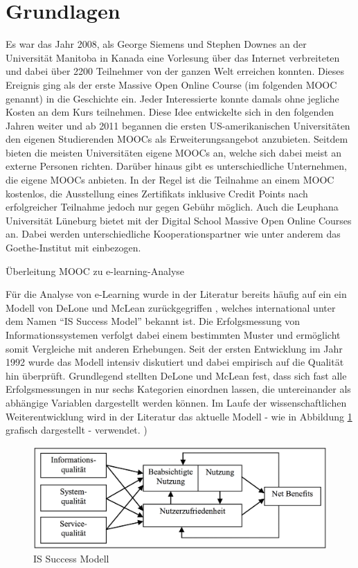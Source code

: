 \section{Grundlagen} %
\label{sec:grundlagen}
Es war das Jahr 2008, als George Siemens und Stephen Downes an der Universität Manitoba in Kanada eine Vorlesung über das Internet verbreiteten und dabei über 2200 Teilnehmer von der ganzen Welt erreichen konnten. Dieses Ereignis ging als der erste Massive Open Online Course (im folgenden MOOC genannt) in die Geschichte ein. Jeder Interessierte konnte damals ohne jegliche Kosten an dem Kurs teilnehmen. Diese Idee entwickelte sich in den folgenden Jahren weiter und ab 2011 begannen die ersten US-amerikanischen Universitäten den eigenen Studierenden MOOCs als Erweiterungsangebot anzubieten. Seitdem bieten die meisten Universitäten eigene MOOCs an, welche sich dabei meist an externe Personen richten. Darüber hinaus gibt es unterschiedliche Unternehmen, die eigene MOOCs anbieten. In der Regel ist die Teilnahme an einem MOOC kostenlos, die Ausstellung eines Zertifikats inklusive Credit Points nach erfolgreicher Teilnahme jedoch nur gegen Gebühr möglich.
\newline 
Auch die Leuphana Universität Lüneburg bietet mit der Digital School Massive Open Online Courses an. Dabei werden unterschiedliche Kooperationspartner wie unter anderem das Goethe-Institut mit einbezogen.


Überleitung MOOC zu e-learning-Analyse

Für die Analyse von e-Learning wurde in der Literatur bereits häufig auf ein ein Modell von DeLone und McLean zurückgegriffen \parencite[vgl.]{mohammadi2015factors, freeze2010success}, welches international unter dem Namen "`IS Success Model"' bekannt ist. Die Erfolgsmessung von Informationssystemen verfolgt dabei einem bestimmten Muster und ermöglicht somit Vergleiche mit anderen Erhebungen. Seit der ersten Entwicklung im Jahr 1992 wurde das Modell intensiv diskutiert und dabei empirisch auf die Qualität hin überprüft. Grundlegend stellten DeLone und McLean fest, dass sich fast alle Erfolgsmessungen in nur sechs Kategorien einordnen lassen, die untereinander als abhängige Variablen dargestellt werden können. Im Laufe der wissenschaftlichen Weiterentwicklung wird in der Literatur das aktuelle Modell - wie in Abbildung \ref{IS Success Model} grafisch dargestellt - verwendet. \parencite[vgl.]{delone2002information})

\begin{figure}[h]
\centering
\includegraphics[width=1\textwidth]{Grafiken/issuccess.png}
\caption{IS Success Modell}
\label{IS Success Model}
\end{figure}



